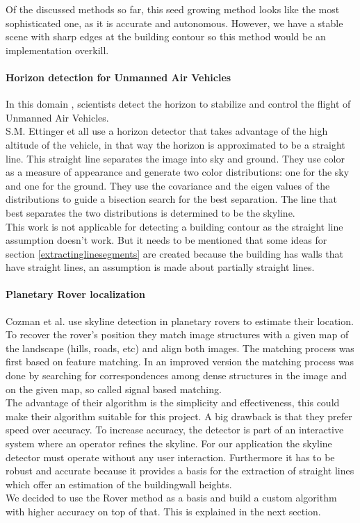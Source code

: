 Of the discussed methods so far, this seed growing method looks like the most sophisticated one, as
it is accurate and autonomous. However, we have a stable scene with sharp edges
at the building contour so this method would be an implementation overkill.  


\paragraph{Horizon detection for Unmanned Air Vehicles}
In this domain \cite{Guidedflight}, scientists detect the horizon to stabilize and control the
flight of Unmanned Air Vehicles.\\  
S.M. Ettinger et all \cite{Guidedflight} use a horizon detector that takes
advantage of the high altitude of the vehicle, in that way the horizon is
approximated to be a straight line.  
This straight line separates the image into sky and ground. They use color as
a measure of appearance and generate two color distributions: one for the sky
and one for the ground. They use the covariance and the eigen values of the
distributions to guide a bisection search for the best separation. The line that
best separates the two distributions is determined to be the skyline.\\

This work is not applicable for detecting a building contour as the straight
line assumption doesn't work.  But it needs to be mentioned that some ideas for
section \ref{extractinglinesegments} are created because the building has walls
that have straight lines, an assumption is made about partially straight lines.

\paragraph{Planetary Rover localization}
Cozman et al. \cite{Rover} use skyline detection in planetary rovers to estimate 
their location.  
To recover the rover's position they match image structures with a given map
of the landscape (hills, roads, etc) and align both images.
The matching process was first based on feature matching. In an improved version
the matching process was done by searching for correspondences among dense
structures in the image and on the given map, so called signal based matching.\\
The advantage of their algorithm is the simplicity and effectiveness, this
could make their algorithm suitable for this project.  A big drawback is that
they prefer speed over accuracy.  To increase accuracy, the detector is part
of an interactive system where an operator refines the skyline.  For our
application the skyline detector must operate without any user interaction.
Furthermore it has to be robust and accurate because it provides a basis for
the extraction of straight lines which offer an estimation of the buildingwall
heights.\\
We decided to use the Rover method \cite{Rover} as a basis and 
build a custom algorithm with higher accuracy on top of that. This is explained
in the next section.




